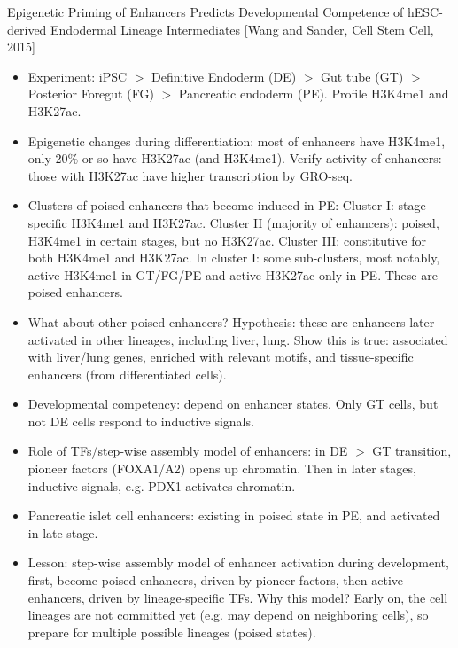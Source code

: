 \documentclass{report}
\begin{document}
Epigenetic Priming of Enhancers Predicts Developmental Competence of hESC-derived Endodermal Lineage Intermediates [Wang and Sander, Cell Stem Cell, 2015]
\begin{itemize}
	\item Experiment: iPSC $>$ Definitive Endoderm (DE) $>$ Gut tube (GT) $>$ Posterior Foregut (FG) $>$ Pancreatic endoderm (PE). Profile H3K4me1 and H3K27ac.
	
	\item Epigenetic changes during differentiation: most of enhancers have H3K4me1, only 20\% or so have H3K27ac (and H3K4me1). Verify activity of enhancers: those with H3K27ac have higher transcription by GRO-seq.
	
	\item Clusters of poised enhancers that become induced in PE: Cluster I: stage-specific H3K4me1 and H3K27ac. Cluster II (majority of enhancers): poised, H3K4me1 in certain stages, but no H3K27ac. Cluster III: constitutive for both H3K4me1 and H3K27ac. In cluster I: some sub-clusters, most notably, active H3K4me1 in GT/FG/PE and active H3K27ac only in PE. These are poised enhancers.
	
	\item What about other poised enhancers? Hypothesis: these are enhancers later activated in other lineages, including liver, lung. Show this is true: associated with liver/lung genes, enriched with relevant motifs, and tissue-specific enhancers (from differentiated cells).
	
	\item Developmental competency: depend on enhancer states. Only GT cells, but not DE cells respond to inductive signals.
	
	\item Role of TFs/step-wise assembly model of enhancers: in DE $>$ GT transition, pioneer factors (FOXA1/A2) opens up chromatin. Then in later stages, inductive signals, e.g. PDX1 activates chromatin.
	
	\item Pancreatic islet cell enhancers: existing in poised state in PE, and activated in late stage.
	
	\item Lesson: step-wise assembly model of enhancer activation during development, first, become poised enhancers, driven by pioneer factors, then active enhancers, driven by lineage-specific TFs. Why this model? Early on, the cell lineages are not committed yet (e.g. may depend on neighboring cells), so prepare for multiple possible lineages (poised states).  
\end{itemize}
\end{document}
